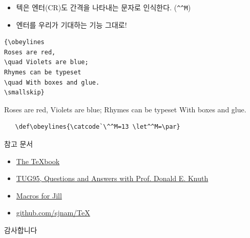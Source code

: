 \documentclass{beamer}
\begin{document}
%
\begin{frame}[fragile]{\texttt{\string\obeylines}}
  \begin{itemize}
  \item 텍은 엔터(CR)도 간격을 나타내는 문자로 인식한다. (\verb+^^M+)%
  \item 엔터를 우리가 기대하는 기능 그대로! 
  \end{itemize}

  \begin{table}[ht]
  \begin{minipage}[t]{.4\textwidth}
  \begin{Verbatim}[fontsize=\small]
{\obeylines
Roses are red,
\quad Violets are blue;
Rhymes can be typeset
\quad With boxes and glue.
\smallskip}
  \end{Verbatim}
  \end{minipage}%
  \qquad\qquad
  \begin{minipage}[t]{.4\linewidth}
    {\obeylines
      Roses are red,
      \quad Violets are blue;
      Rhymes can be typeset
      \quad With boxes and glue.
      \smallskip}
  \end{minipage}
  \end{table}
  
  \begin{Verbatim}
   \def\obeylines{\catcode`\^^M=13 \let^^M=\par}
  \end{Verbatim}
\end{frame}


%
\begin{frame}{참고 문서}
  \begin{itemize}
  \item \href{http://ftp.ktug.org/tex-archive/systems/knuth/dist/tex/}
    {The \TeX book}
  \item \href{https://tug.org/TUGboat/tb17-1/tb50knut.pdf}
    {TUG95, Questions and Answers with Prof. Donald E. Knuth}
  \item \href{https://www.tug.org/TUGboat/tb08-3/tb19knut.pdf}
    {Macros for Jill}
  \item \href{https://github.com/sjnam/TeX}
    {github.com/sjnam/TeX}

  \end{itemize}
\end{frame}


%
\begin{frame}[standout]
  감사합니다
\end{frame}
\end{document}
